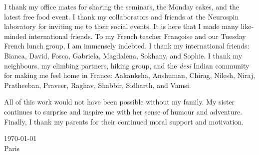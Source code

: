 I thank my office mates for sharing the seminars, the Monday cakes, and the latest free food event. I thank my collaborators and friends at the Neurospin laboratory for inviting me to their social events. It is here that I made many like-minded international friends. To my French teacher Françoise and our Tuesday French lunch group, I am immensely indebted. I thank my international friends: Bianca, David, Fosca, Gabriela, Magdalena, Sokhany, and Sophie. I thank my neighbours, my climbing partners, hiking group, and the \textit{desi} Indian community for making me feel home in France: Aakanksha, Anshuman, Chirag, Nilesh, Niraj, Pratheeban, Praveer, Raghav, Shabbir, Sidharth, and Vamsi.

All of this work would not have been possible without my family. My sister continues to surprise and inspire me with her sense of humour and adventure. Finally, I thank my parents for their continued moral support and motivation.

\vspace{3em}
\today \\
Paris
